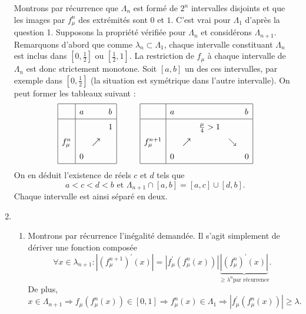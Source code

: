 \begin{enumerate}
Montrons par récurrence que $\Lambda_n$ est formé de $2^n$ intervalles disjoints et que les images par $f_\mu^n$ des extrémités sont $0$ et $1$.\newline
C'est vrai pour $\Lambda_1$ d'après la question 1. Supposons la propriété vérifiée pour $\Lambda_n$ et considérons $\Lambda_{n+1}$.\newline
Remarquons d'abord que comme $\lambda_n\subset \Lambda_1$, chaque intervalle constituant $\Lambda_n$ est inclus dans $\left[ 0, \frac{1}{2} \right]$ ou $\left[ \frac{1}{2}, 1 \right]$. La restriction de $f_\mu$ à chaque intervalle de $\Lambda_n$ est donc strictement monotone.\newline
Soit $\left[ a, b \right]$ un des ces intervalles, par exemple dans $\left[ 0,\frac{1}{2} \right]$ (la situation est symétrique dans l'autre intervalle). On peut former les tableaux suivant :
\begin{displaymath}
\renewcommand{\arraystretch}{1.5}
\begin{array}{|l|lll|} \hline
        & a &          & b \\ \hline
        &   &          & 1 \\ 
f_\mu^n &   & \nearrow &  \\ 
        & 0 &          & \\ \hline
 \end{array}
\hspace{1cm}
\renewcommand{\arraystretch}{1.5}
\begin{array}{|l|lllll|}  \hline
            & a &          &                 &          & b \\ \hline
            &   &          & \frac{\mu}{4}>1 &          &   \\ 
f_\mu^{n+1} &   & \nearrow &                 & \searrow &   \\ 
            & 0 &          &                 &          & 0 \\ \hline
 \end{array}
\end{displaymath}
On en déduit l'existence de réels $c$ et $d$ tels que 
\begin{displaymath}
 a < c < d < b \text{ et } \Lambda_{n+1}\cap [a,b] = [a,c] \cup [d,b] .
\end{displaymath}
Chaque intervalle est ainsi séparé en deux.
\item\begin{enumerate}
 \item Montrons par récurrence l'inégalité demandée. Il s'agit simplement de dériver une fonction composée 
\begin{displaymath}
 \forall x\in \lambda_{n+1} : \left\vert (f_\mu^{n+1})^\prime (x)\right\vert = \left\vert f_\mu^\prime(f_\mu^n(x))\right\vert\underset{\geq \lambda ^n \text{par récurrence}}{\underbrace{\left\vert(f_\mu^{n})^\prime (x)\right\vert}}.
\end{displaymath}
De plus,
\begin{displaymath}
 x\in \Lambda_{n+1} \Rightarrow f_\mu(f_\mu^n(x))\in[0,1] \Rightarrow f_\mu^n(x) \in \Lambda_1
\Rightarrow \left\vert f_\mu^\prime(f_\mu^n(x))\right\vert \geq \lambda .
\end{displaymath}


\end{enumerate}
\end{enumerate}

